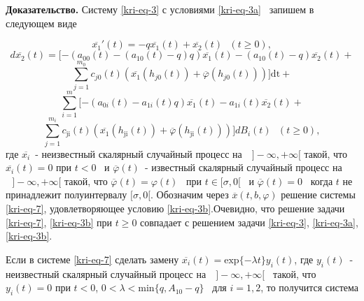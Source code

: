 \textbf{Доказательство.} Систему \eqref{kri-eq-3} с условиями \eqref{kri-eq-3a} \ запишем в следующем виде

\begin{equation*}
	\overline{x_1}'(t)=-q\overline{x_1}(t)+\overline{x_2}(t)\text{   }(t\ge 0),
\end{equation*}
\begin{equation*}
	d\overline{x_2}(t)=[-(a_{00}(t)-(a_{10}(t)-q)q)\overline{x_1}(t)-(a_{10}(t)-q)\overline{x_2}(t)+
\end{equation*}
\begin{equation}\label{kri-eq-7}
	\overset{m_0}{\underset{j=1}{\sum }}c_{\mathit{j0}}(t)(\overline{x_1}(h_{\mathit{j0}}(t))+\overline{\varphi
	}(h_{\mathit{j0}}(t)))]\text{dt}+
\end{equation}
\begin{equation*}
	\overset m{\underset{i=1}{\sum
	}}[-(a_{0i}(t)-a_{1i}(t)q)\overline{x_1}(t)-a_{1i}(t)\overline{x_2}(t)+
\end{equation*}
\begin{equation*}
	\overset{m_i}{\underset{j=1}{\sum
	}}c_{\text{ji}}(t)(\overline{x_1}(h_{\text{ji}}(t))+\overline{\varphi
	}(h_{\text{ji}}(t)))]\mathit{dB}_i(t)\text{  }(t\ge 0),
\end{equation*}
где  $\overline{x_i}$\ {}- неизвестный скалярный случайный процесс на
$\text{  }]-\infty ,+\infty [$ такой, что  $\overline{x_i}(t)=0$ при
$t<0$ \ и  $\overline{\varphi }(t)$\ {}- известный скалярный случайный процесс на $\text{  }]-\infty ,+\infty
[$ такой, что  $\overline{\varphi }(t)=\varphi (t)$ \ при  $t\in [\sigma ,0[$ \ и  $\overline{\varphi
}(t)=0$ \ когда  $t$ не принадлежит полуинтервалу  $[\sigma ,0[$. Обозначим через
$\overline x(t,b,\varphi )$ решение системы \eqref{kri-eq-7}, удовлетворяющее условию \eqref{kri-eq-3b}.Очевидно, что
решение задачи \eqref{kri-eq-7}, \eqref{kri-eq-3b} при  $t\ge 0$ совпадает с решением задачи \eqref{kri-eq-3}, \eqref{kri-eq-3a}, \eqref{kri-eq-3b}.

Если в системе \eqref{kri-eq-7} сделать замену  $\overline{x_i}(t)=\text{exp}\{-\mathit{\lambda t}\}y_i(t)$, где  $y_i(t)$\ {}-
неизвестный скалярный случайный процесс на  $\text{  }]-\infty ,+\infty [$ \ такой, что $y_i(t)=0$ при  $t<0$,
$0<\lambda <\text{min}\{q,A_{10}-q\}$ \ для  $i=1,2$, то получится система

